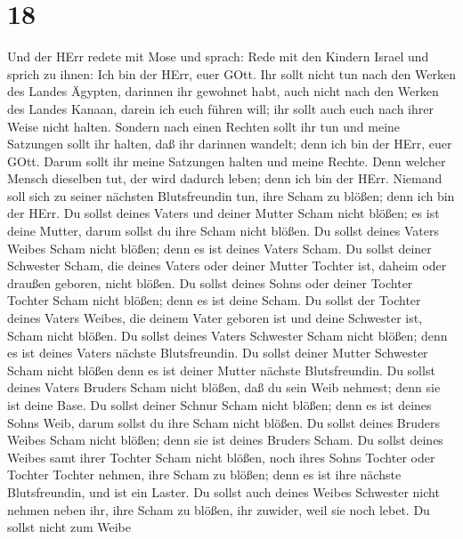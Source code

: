 \hypertarget{section-17}{%
\section{18}\label{section-17}}

 Und der HErr redete mit Mose und sprach:  Rede
mit den Kindern Israel und sprich zu ihnen: Ich bin der HErr, euer GOtt.
 Ihr sollt nicht tun nach den Werken des Landes Ägypten,
darinnen ihr gewohnet habt, auch nicht nach den Werken des Landes
Kanaan, darein ich euch führen will; ihr sollt auch euch nach ihrer
Weise nicht halten.  Sondern nach einen Rechten sollt ihr
tun und meine Satzungen sollt ihr halten, daß ihr darinnen wandelt; denn
ich bin der HErr, euer GOtt.  Darum sollt ihr meine
Satzungen halten und meine Rechte. Denn welcher Mensch dieselben tut,
der wird dadurch leben; denn ich bin der HErr.  Niemand soll
sich zu seiner nächsten Blutsfreundin tun, ihre Scham zu blößen; denn
ich bin der HErr.  Du sollst deines Vaters und deiner Mutter
Scham nicht blößen; es ist deine Mutter, darum sollst du ihre Scham
nicht blößen.  Du sollst deines Vaters Weibes Scham nicht
blößen; denn es ist deines Vaters Scham.  Du sollst deiner
Schwester Scham, die deines Vaters oder deiner Mutter Tochter ist,
daheim oder draußen geboren, nicht blößen.  Du sollst
deines Sohns oder deiner Tochter Tochter Scham nicht blößen; denn es ist
deine Scham.  Du sollst der Tochter deines Vaters Weibes,
die deinem Vater geboren ist und deine Schwester ist, Scham nicht
blößen.  Du sollst deines Vaters Schwester Scham nicht
blößen; denn es ist deines Vaters nächste Blutsfreundin. 
Du sollst deiner Mutter Schwester Scham nicht blößen denn es ist deiner
Mutter nächste Blutsfreundin.  Du sollst deines Vaters
Bruders Scham nicht blößen, daß du sein Weib nehmest; denn sie ist deine
Base.  Du sollst deiner Schnur Scham nicht blößen; denn es
ist deines Sohns Weib, darum sollst du ihre Scham nicht blößen.
 Du sollst deines Bruders Weibes Scham nicht blößen; denn
sie ist deines Bruders Scham.  Du sollst deines Weibes samt
ihrer Tochter Scham nicht blößen, noch ihres Sohns Tochter oder Tochter
Tochter nehmen, ihre Scham zu blößen; denn es ist ihre nächste
Blutsfreundin, und ist ein Laster.  Du sollst auch deines
Weibes Schwester nicht nehmen neben ihr, ihre Scham zu blößen, ihr
zuwider, weil sie noch lebet.  Du sollst nicht zum Weibe
